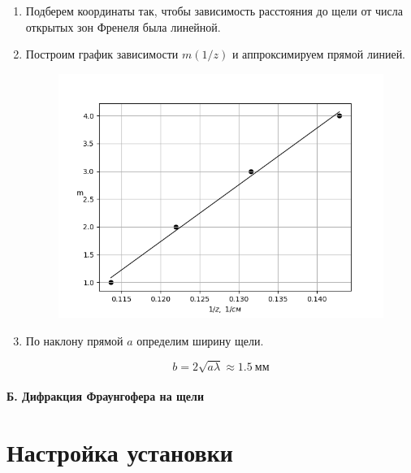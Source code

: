 \documentclass[14pt, a4paper]{report}
\begin{document}
\begin{enumerate}

\item Подберем координаты так, чтобы зависимость расстояния до щели от числа открытых зон Френеля была линейной.

\item Построим график зависимости $m(1/z)$ и аппроксимируем прямой линией.

\begin{figure}[H]
\centering
\includegraphics[scale=0.6]{../images/431_2}
\end{figure}

\item По наклону прямой $a$ определим ширину щели.

\[b=2\sqrt{a\lambda}\approx1.5\ мм\]

\end{enumerate}

\paragraph*{Б. Дифракция Фраунгофера на щели}

\section{Настройка установки}
\end{document}

